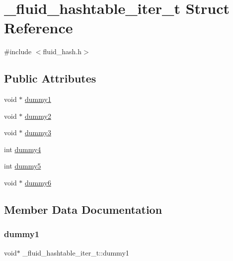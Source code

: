 \hypertarget{struct__fluid__hashtable__iter__t}{}\section{\+\_\+fluid\+\_\+hashtable\+\_\+iter\+\_\+t Struct Reference}
\label{struct__fluid__hashtable__iter__t}


{\ttfamily \#include $<$fluid\+\_\+hash.\+h$>$}

\subsection*{Public Attributes}
\begin{DoxyCompactItemize}
\item 
void $\ast$ \hyperlink{struct__fluid__hashtable__iter__t_a06505470f098ef34374d34a16150f0cc}{dummy1}
\item 
void $\ast$ \hyperlink{struct__fluid__hashtable__iter__t_a9fea8aa1270f65a8ef772ea05bd29b0d}{dummy2}
\item 
void $\ast$ \hyperlink{struct__fluid__hashtable__iter__t_acdd19213d8fc7d5ae778f6e84b0a7427}{dummy3}
\item 
int \hyperlink{struct__fluid__hashtable__iter__t_a0eef08d9869207e6bb0dff617e0c3685}{dummy4}
\item 
int \hyperlink{struct__fluid__hashtable__iter__t_ab74590c5530f04f57483fd2b258aaaa1}{dummy5}
\item 
void $\ast$ \hyperlink{struct__fluid__hashtable__iter__t_ae09389dba11644fbfb6183416e889fd2}{dummy6}
\end{DoxyCompactItemize}


\subsection{Member Data Documentation}
\mbox{\label{struct__fluid__hashtable__iter__t_a06505470f098ef34374d34a16150f0cc}} 
\subsubsection{\texorpdfstring{dummy1}{dummy1}}
{\footnotesize\ttfamily void$\ast$ \+\_\+fluid\+\_\+hashtable\+\_\+iter\+\_\+t\+::dummy1}

